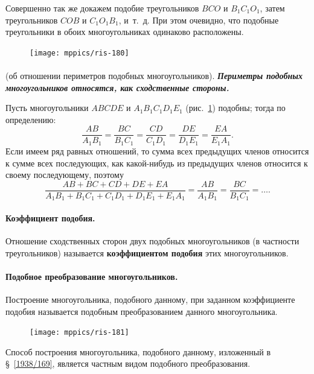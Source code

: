 \documentclass[oneside]{book}
\begin{document}
Совершенно так же докажем подобие треугольников $BCO$ и $B_1C_1O_1$, затем треугольников $COB$ и $C_1O_1B_1$, и~т.~д.
При этом очевидно, что подобные треугольники в обоих многоугольниках одинаково расположены.

\begin{figure}[h]
\centering
\texttt{[image: mppics/ris-180]}
\caption{}\label{1938/ris-180}
\end{figure}

\paragraph{}\label{1938/172}
 (об отношении периметров подобных многоугольников).
\textbf{\emph{Периметры подобных многоугольников относятся, как сходственные стороны.}}

Пусть многоугольники $ABCDE$ и $A_1B_1C_1D_1E_1$ (рис.~\ref{1938/ris-180}) подобны;
тогда по определению:
\[\frac{AB}{A_1B_1}=\frac{BC}{B_1C_1}=\frac{CD}{C_1D_1}=\frac{DE}{D_1E_1}=\frac{EA}{E_1A_1}.\]
Если имеем ряд равных отношений, то сумма всех предыдущих членов относится к сумме всех последующих, как какой-нибудь из предыдущих членов относится к своему последующему, поэтому
\[\frac{AB+BC+CD+DE+EA}{A_1B_1+B_1C_1+C_1D_1+D_1E_1+E_1A_1}=\frac{AB}{A_1B_1}=\frac{BC}{B_1C_1}=\dots.\]


\paragraph{Коэффициент подобия.}\label{1938/173}
Отношение сходственных сторон двух подобных многоугольников (в частности  треугольников) называется \textbf{коэффициентом подобия} этих многоугольников.

\paragraph{Подобное преобразование многоугольников.}\label{1938/174}
Построение многоугольника, подобного данному, при заданном коэффициенте подобия называется подобным преобразованием данного многоугольника. %

\begin{figure}
\centering
\texttt{[image: mppics/ris-181]}
\caption{}\label{1938/ris-181}
\end{figure}

Способ построения многоугольника, подобного данному, изложенный в §~\ref{1938/169}, является частным видом подобного преобразования.
\end{document}
